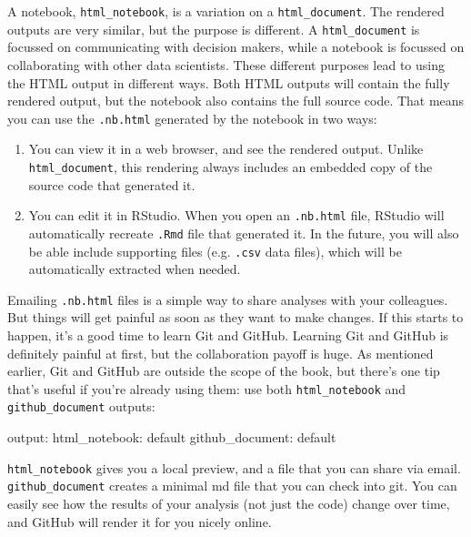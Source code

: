 \documentclass[]{book}
\newenvironment{Shaded}{\begin{snugshade}}{\end{snugshade}}
\newcommand{\FunctionTok}[1]{\textcolor[rgb]{0.00,0.00,0.00}{{#1}}}
\newcommand{\NormalTok}[1]{{#1}}
\begin{document}
A notebook, \texttt{html\_notebook}, is a variation on a
\texttt{html\_document}. The rendered outputs are very similar, but the
purpose is different. A \texttt{html\_document} is focussed on
communicating with decision makers, while a notebook is focussed on
collaborating with other data scientists. These different purposes lead
to using the HTML output in different ways. Both HTML outputs will
contain the fully rendered output, but the notebook also contains the
full source code. That means you can use the \texttt{.nb.html} generated
by the notebook in two ways:

\begin{enumerate}
\def\labelenumi{\arabic{enumi}.}
\item
  You can view it in a web browser, and see the rendered output. Unlike
  \texttt{html\_document}, this rendering always includes an embedded
  copy of the source code that generated it.
\item
  You can edit it in RStudio. When you open an \texttt{.nb.html} file,
  RStudio will automatically recreate \texttt{.Rmd} file that generated
  it. In the future, you will also be able include supporting files
  (e.g. \texttt{.csv} data files), which will be automatically extracted
  when needed.
\end{enumerate}

Emailing \texttt{.nb.html} files is a simple way to share analyses with
your colleagues. But things will get painful as soon as they want to
make changes. If this starts to happen, it's a good time to learn Git
and GitHub. Learning Git and GitHub is definitely painful at first, but
the collaboration payoff is huge. As mentioned earlier, Git and GitHub
are outside the scope of the book, but there's one tip that's useful if
you're already using them: use both \texttt{html\_notebook} and
\texttt{github\_document} outputs:

\begin{Shaded}
\begin{Highlighting}[]
\FunctionTok{output:}
  \FunctionTok{html_notebook:} \NormalTok{default}
  \FunctionTok{github_document:} \NormalTok{default}
\end{Highlighting}
\end{Shaded}

\texttt{html\_notebook} gives you a local preview, and a file that you
can share via email. \texttt{github\_document} creates a minimal md file
that you can check into git. You can easily see how the results of your
analysis (not just the code) change over time, and GitHub will render it
for you nicely online.
\end{document}
